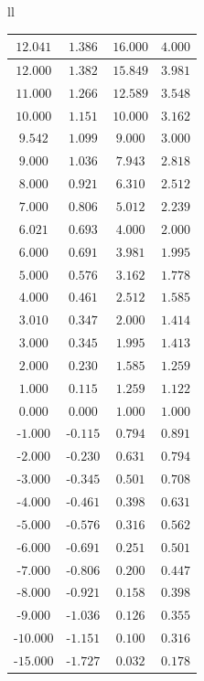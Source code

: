 \begin{tabular}{ll}
{\begin{tabular}{|c|c|c|c|}
	\textbf{$12.041$} & $1.386$ & \textbf{$16.000$} & \textbf{$4.000$} \\ \hline
	\textbf{$12.000$} & $1.382$ & $15.849$ & $3.981$ \\ \hline
	$11.000$ & $1.266$ & $12.589$ & $3.548$ \\ \hline
	\textbf{$10.000$} & $1.151$ & \textbf{$10.000$} & $3.162$ \\ \hline
	$9.542$ & $1.099$ & $9.000$ & $3.000$ \\ \hline
	$9.000$ & $1.036$ & $7.943$ & $2.818$ \\ \hline
	$8.000$ & $0.921$ & $6.310$ & $2.512$ \\ \hline
	$7.000$ & $0.806$ & $5.012$ & $2.239$ \\ \hline
	\textbf{$6.021$} & \textbf{$0.693$} & \textbf{$4.000$} & \textbf{$2.000$} \\ \hline
	$6.000$ & $0.691$ & $3.981$ & $1.995$ \\ \hline
	$5.000$ & $0.576$ & $3.162$ & $1.778$ \\ \hline
	$4.000$ & $0.461$ & $2.512$ & $1.585$ \\ \hline
	\textbf{$3.010$} & \textbf{$0.347$} & \textbf{$2.000$} & \textbf{$1.414$} \\ \hline
	$3.000$ & $0.345$ & $1.995$ & $1.413$ \\ \hline
	$2.000$ & $0.230$ & $1.585$ & $1.259$ \\ \hline
	$1.000$ & $0.115$ & $1.259$ & $1.122$ \\ \hline
	$0.000$ & $0.000$ & $1.000$ & $1.000$ \\ \hline
	-$1.000$ & -$0.115$ & $0.794$ & $0.891$ \\ \hline
	-$2.000$ & -$0.230$ & $0.631$ & $0.794$ \\ \hline
	-$3.000$ & -$0.345$ & $0.501$ & $0.708$ \\ \hline
	-$4.000$ & -$0.461$ & $0.398$ & $0.631$ \\ \hline
	-$5.000$ & -$0.576$ & $0.316$ & $0.562$ \\ \hline
	-$6.000$ & -$0.691$ & $0.251$ & $0.501$ \\ \hline
	-$7.000$ & -$0.806$ & $0.200$ & $0.447$ \\ \hline
	-$8.000$ & -$0.921$ & $0.158$ & $0.398$ \\ \hline
	-$9.000$ & -$1.036$ & $0.126$ & $0.355$ \\ \hline
	-$10.000$ & -$1.151$ & $0.100$ & $0.316$ \\ \hline
	-$15.000$ & -$1.727$ & $0.032$ & $0.178$ \\ \hline

\end{tabular}}
\end{tabular}
